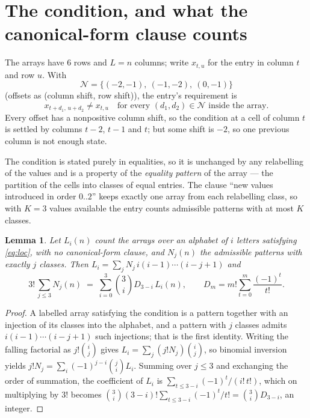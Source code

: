 \documentclass[11pt,a4paper]{article}
\theoremstyle{plain}
\newtheorem{lemma}[theorem]{Lemma}
\theoremstyle{definition}
\begin{document}
\section{The condition, and what the canonical-form clause counts}

The arrays have $6$ rows and $L=n$ columns; write $x_{t,u}$ for the entry in
column $t$ and row $u$. With
\[
\mathcal N=\{(-2,-1),\ (-1,-2),\ (0,-1)\}
\]
(offsets as (column shift, row shift)), the entry's requirement is
\begin{equation}\label{eq:loc}
x_{t+d_1,\,u+d_2}\ne x_{t,u}\quad\text{for every }(d_1,d_2)\in\mathcal N\text{ inside the array}.
\end{equation}
Every offset has a nonpositive column shift, so the condition at a cell of column $t$ is
settled by columns $t-2$, $t-1$ and $t$; but some shift is $-2$, so one previous column is not
enough state.

The condition is stated purely in equalities, so it is unchanged by any relabelling of the
values and is a property of the \emph{equality pattern} of the array --- the partition of
the cells into classes of equal entries. The clause ``new values introduced in order
$0..2$'' keeps exactly one array from each relabelling class, so with $K=3$ values
available the entry counts admissible patterns with at most $K$ classes.

\begin{lemma}\label{lem:inv}
Let $L_i(n)$ count the arrays over an alphabet of $i$ letters satisfying \eqref{eq:loc},
with no canonical-form clause, and $N_j(n)$ the admissible patterns with exactly $j$ classes.
Then $L_i=\sum_j N_j\,i(i-1)\cdots(i-j+1)$ and
\[
3!\,\sum_{j\le 3}N_j(n)\;=\;\sum_{i=0}^{3}\binom{3}{i}D_{3-i}\,L_i(n),
\qquad D_m=m!\sum_{t=0}^{m}\frac{(-1)^t}{t!} .
\]
\end{lemma}

\begin{proof}
A labelled array satisfying the condition is a pattern together with an injection of its
classes into the alphabet, and a pattern with $j$ classes admits $i(i-1)\cdots(i-j+1)$ such
injections; that is the first identity. Writing the falling factorial as $j!\binom{i}{j}$
gives $L_i=\sum_j(j!N_j)\binom{i}{j}$, so binomial inversion yields
$j!N_j=\sum_i(-1)^{j-i}\binom{j}{i}L_i$. Summing over $j\le3$ and exchanging the
order of summation, the coefficient of $L_i$ is $\sum_{t\le3-i}(-1)^t/(i!\,t!)$, which on
multiplying by $3!$ becomes
$\binom{3}{i}(3-i)!\sum_{t\le3-i}(-1)^t/t!=\binom{3}{i}D_{3-i}$, an
integer.
\end{proof}
\end{document}
